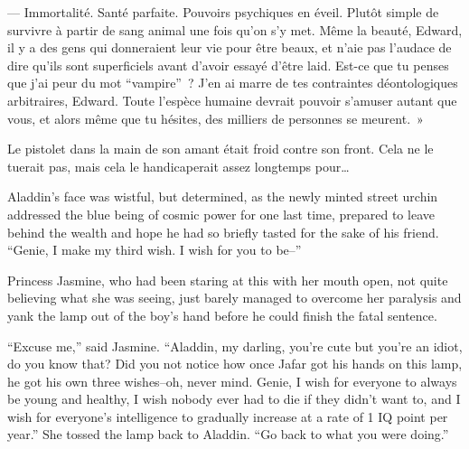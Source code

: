 --- Immortalité. Santé parfaite. Pouvoirs psychiques en éveil. Plutôt simple de survivre à partir de sang animal une fois qu'on s'y met. Même la beauté, Edward, il y a des gens qui donneraient leur vie pour être beaux, et n'aie pas l'audace de dire qu'ils sont superficiels avant d'avoir essayé d'être laid. Est-ce que tu penses que j'ai peur du mot “vampire”~? J'en ai marre de tes contraintes déontologiques arbitraires, Edward. Toute l'espèce humaine devrait pouvoir s'amuser autant que vous, et alors même que tu hésites, des milliers de personnes se meurent.~»

Le pistolet dans la main de son amant était froid contre son front. Cela ne le tuerait pas, mais cela le handicaperait assez longtemps pour…


Aladdin’s face was wistful, but determined, as the newly minted street urchin addressed the blue being of cosmic power for one last time, prepared to leave behind the wealth and hope he had so briefly tasted for the sake of his friend. “Genie, I make my third wish. I wish for you to be--”

Princess Jasmine, who had been staring at this with her mouth open, not quite believing what she was seeing, just barely managed to overcome her paralysis and yank the lamp out of the boy’s hand before he could finish the fatal sentence.

“Excuse me,” said Jasmine. “Aladdin, my darling, you’re cute but you’re an idiot, do you know that? Did you not notice how once Jafar got his hands on this lamp, he got his own three wishes--oh, never mind. Genie, I wish for everyone to always be young and healthy, I wish nobody ever had to die if they didn’t want to, and I wish for everyone’s intelligence to gradually increase at a rate of 1 IQ point per year.” She tossed the lamp back to Aladdin. “Go back to what you were doing.”

%
%

